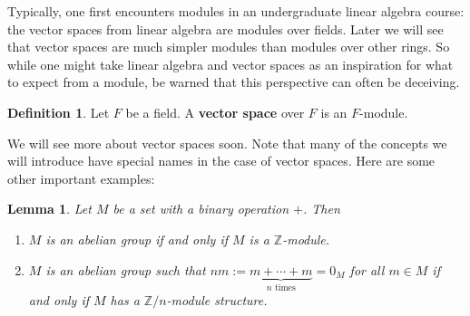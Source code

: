 \documentclass[12pt]{report}
\newtheorem{lemma}[theorem]{Lemma}
\numberwithin{equation}{section}
\numberwithin{theorem}{chapter}
\theoremstyle{definition}
\newtheorem{definition}[theorem]{Definition}
\newtheorem*{basic properties}{Basic Properties}
\newtheorem*{Important Remark}{Important Remark}
\newcommand{\df}[1]{{\bf #1}\index{#1}}
\newcommand{\Z}{\mathbb{Z}}
\begin{document}
Typically, one first encounters modules in an undergraduate linear algebra course: the vector spaces from linear algebra are modules over fields. Later we will see that vector spaces are much simpler modules than modules over other rings. So while one might take linear algebra and vector spaces as an inspiration for what to expect from a module, be warned that this perspective can often be deceiving.

\begin{definition}
	Let $F$ be a field. A \df{vector space} over $F$ is an $F$-module.
\end{definition}

We will see more about vector spaces soon. Note that many of the concepts we will introduce have special names in the case of vector spaces. Here are some other important examples:



\begin{lemma}\label{Zmods are abelian groups}
 Let $M$ be a set with a binary operation $+$. Then 
 \begin{enumerate}[label=(\arabic*)]
 \item $M$ is an abelian group if and only if $M$ is a $\Z$-module.
 \item $M$ is an abelian group such that $nm:=\underbrace{ m + \cdots + m}_{n \textrm{ times}}=0_M$ for all $m\in M$ if and only if $M$ has a $\Z/n$-module structure.
 \end{enumerate}
\end{lemma}
\end{document}

